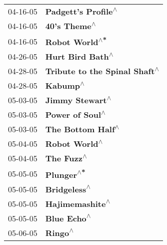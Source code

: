 \begin{supertabular}{p{0.25\columnwidth}p{0.75\columnwidth}}
 04-16-05 &                                                        \textbf{Padgett's Profile\textsuperscript{$\wedge$}} \\
 04-16-05 &                                                               \textbf{40's Theme\textsuperscript{$\wedge$}} \\
 04-16-05 &                                                             \textbf{Robot World\textsuperscript{$\wedge$*}} \\
 04-26-05 &                                                           \textbf{Hurt Bird Bath\textsuperscript{$\wedge$}} \\
 04-28-05 &                                              \textbf{Tribute to the Spinal Shaft\textsuperscript{$\wedge$}} \\
 04-28-05 &                                                                   \textbf{Kabump\textsuperscript{$\wedge$}} \\
 05-03-05 &                                                            \textbf{Jimmy Stewart\textsuperscript{$\wedge$}} \\
 05-03-05 &                                                            \textbf{Power of Soul\textsuperscript{$\wedge$}} \\
 05-03-05 &                                                          \textbf{The Bottom Half\textsuperscript{$\wedge$}} \\
 05-04-05 &                                                              \textbf{Robot World\textsuperscript{$\wedge$}} \\
 05-04-05 &                                                                 \textbf{The Fuzz\textsuperscript{$\wedge$}} \\
 05-05-05 &                                                                 \textbf{Plunger\textsuperscript{$\wedge$*}} \\
 05-05-05 &                                                               \textbf{Bridgeless\textsuperscript{$\wedge$}} \\
 05-05-05 &                                                            \textbf{Hajimemashite\textsuperscript{$\wedge$}} \\
 05-05-05 &                                                                \textbf{Blue Echo\textsuperscript{$\wedge$}} \\
 05-06-05 &                                                                    \textbf{Ringo\textsuperscript{$\wedge$}} \\

\end{supertabular}
